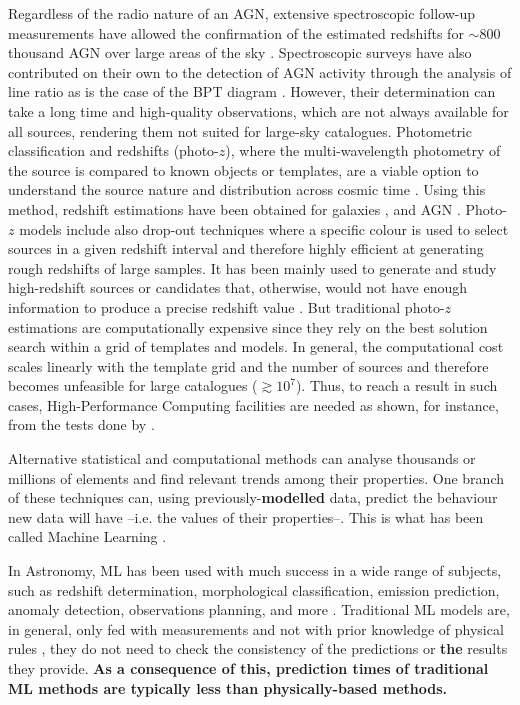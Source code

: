 \documentclass{aa}
\begin{document}
Regardless of the radio nature of an AGN, extensive spectroscopic follow-up measurements have allowed the confirmation of the estimated redshifts for ${\sim} 800$ thousand AGN over large areas of the sky \citep{2021arXiv210512985F}. Spectroscopic surveys have also contributed on their own to the detection of AGN activity through the analysis of line ratio as is the case of the BPT diagram \citep*{1981PASP...93....5B}. However, their determination can take a long time and high-quality observations, which are not always available for all sources, rendering them not suited for large-sky catalogues. Photometric classification and redshifts (photo-$z$), where the multi-wavelength photometry of the source is compared to known objects or templates, are a viable option to understand the source nature and distribution across cosmic time \citep{1957AJ.....62....6B, 2019NatAs...3..212S}. Using this method, redshift estimations have been obtained for galaxies \citep[e.g.][]{2021A&A...654A.101H}, and AGN \citep[e.g.][]{2017ApJ...850...66A}. Photo-$z$ models include also drop-out techniques where a specific colour is used to select sources in a given redshift interval and therefore highly efficient at generating rough redshifts of large samples. It has been mainly used to generate and study high-redshift sources or candidates that, otherwise, would not have enough information to produce a precise redshift value \citep[e.g.][]{2020ApJ...902..112B, 2020A&A...633A.160C, 2022arXiv221106915S}. But traditional photo-$z$ estimations are computationally expensive since they rely on the best solution search within a grid of templates and models. In general, the computational cost scales linearly with the template grid and the number of sources
and therefore becomes unfeasible for large catalogues (${\gtrsim}10^{7}$). Thus, to reach a result in such cases, High-Performance Computing facilities are needed as shown, for instance, from the tests done by \citet{2021ApJ...916...43G}. 

Alternative statistical and computational methods can analyse thousands or millions of elements and find relevant trends among their properties. One branch of these techniques can, using previously-\textbf{modelled} data, predict the behaviour new data will have --i.e. the values of their properties--. This is what has been called Machine Learning \citep[ML;][]{5392560}.

In Astronomy, ML has been used with much success in a wide range of subjects, such as redshift determination, morphological classification, emission prediction, anomaly detection, observations planning, and more \citep[\textbf{e.g.}][]{2010IJMPD..19.1049B, 2019arXiv190407248B}. 
Traditional ML models are, in general, only fed with measurements and not with prior knowledge of physical rules \citep{Desai2021}, they do not need to check the consistency of the predictions or \textbf{the} results they provide. \textbf{As a consequence of this, prediction times of traditional ML methods are typically less than physically-based methods.}
\end{document}
